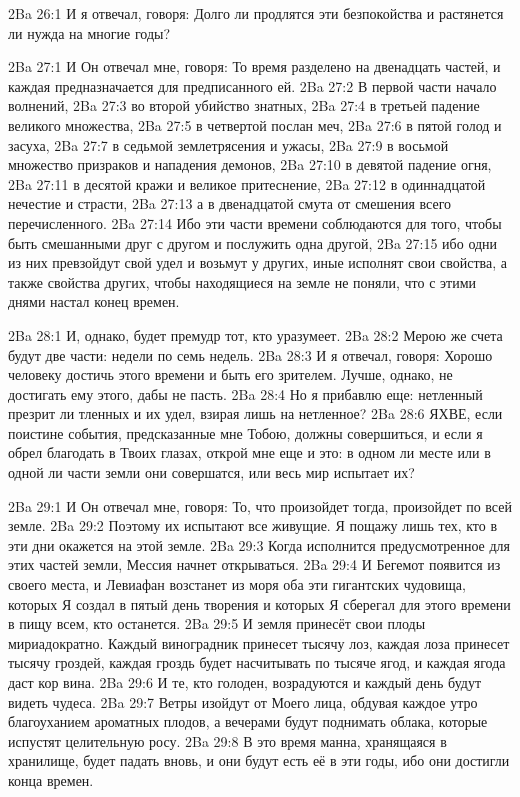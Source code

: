 \vs 2Ba 26:1
И я отвечал, говоря: Долго ли продлятся эти безпокойства и растянется ли нужда на многие годы?

\vs 2Ba 27:1
И Он отвечал мне, говоря: То время разделено на двенадцать частей, и каждая предназначается для предписанного ей.
\vs 2Ba 27:2
В первой части начало волнений,
\vs 2Ba 27:3
во второй убийство знатных,
\vs 2Ba 27:4
в третьей падение великого множества,
\vs 2Ba 27:5
в четвертой послан меч,
\vs 2Ba 27:6
в пятой голод и засуха,
\vs 2Ba 27:7
в седьмой землетрясения и ужасы,
\vs 2Ba 27:9
в восьмой множество призраков и нападения демонов,
\vs 2Ba 27:10
в девятой падение огня,
\vs 2Ba 27:11
в десятой кражи и великое притеснение,
\vs 2Ba 27:12
в одиннадцатой нечестие и страсти,
\vs 2Ba 27:13
а в двенадцатой смута от смешения всего перечисленного.
\vs 2Ba 27:14
Ибо эти части времени соблюдаются для того, чтобы быть смешанными друг с другом и послужить одна другой,
\vs 2Ba 27:15
ибо одни из них превзойдут свой удел и возьмут у других, иные исполнят свои свойства, а также свойства других, чтобы находящиеся на земле не поняли, что с этими днями настал конец времен.

\vs 2Ba 28:1
И, однако, будет премудр тот, кто уразумеет.
\vs 2Ba 28:2
Мерою же счета будут две части: недели по семь недель.
\vs 2Ba 28:3
И я отвечал, говоря: Хорошо человеку достичь этого времени и быть его зрителем. Лучше, однако, не достигать ему этого, дабы не пасть.
\vs 2Ba 28:4
Но я прибавлю еще: нетленный презрит ли тленных и их удел, взирая лишь на нетленное?
\vs 2Ba 28:6
ЯХВЕ, если поистине события, предсказанные мне Тобою, должны совершиться, и если я обрел благодать в Твоих глазах, открой мне еще и это: в одном ли месте или в одной ли части земли они совершатся, или весь мир испытает их?

\vs 2Ba 29:1
И Он отвечал мне, говоря: То, что произойдет тогда, произойдет по всей земле.
\vs 2Ba 29:2
Поэтому их испытают все живущие. Я пощажу лишь тех, кто в эти дни окажется на этой земле.
\vs 2Ba 29:3
Когда исполнится предусмотренное для этих частей земли, Мессия начнет открываться.
\vs 2Ba 29:4
И Бегемот появится из своего места, и Левиафан возстанет из моря оба эти гигантских чудовища, которых Я создал в пятый день творения и которых Я сберегал для этого времени в пищу всем, кто останется.
\vs 2Ba 29:5
И земля принесёт свои плоды мириадократно. Каждый виноградник принесет тысячу лоз, каждая лоза принесет тысячу гроздей, каждая гроздь будет насчитывать по тысяче ягод, и каждая ягода даст кор вина.
\vs 2Ba 29:6
И те, кто голоден, возрадуются и каждый день будут видеть чудеса.
\vs 2Ba 29:7
Ветры изойдут от Моего лица, обдувая каждое утро благоуханием ароматных плодов, а вечерами будут поднимать облака, которые испустят целительную росу.
\vs 2Ba 29:8
В это время манна, хранящаяся в хранилище, будет падать вновь, и они будут есть её в эти годы, ибо они достигли конца времен.


